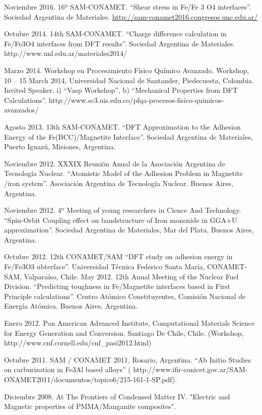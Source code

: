 Noviembre 2016. 16º SAM-CONAMET. ``Shear stress in Fe/Fe 3 O4
interfaces''. Sociedad Argentina de Materiales.
\url{http://sam-conamet2016.congresos.unc.edu.ar/}

Octubre 2014. 14th SAM-CONAMET. ``Charge difference calculation in
Fe/Fe3O4 interfaces from DFT results''. Sociedad Argentina de
Materiales. http://www.unl.edu.ar/materiales2014/

Marzo 2014. Workshop en Procesamiento Físico Químico Avanzado. Workshop,
10 -- 15 March 2014, Universidad Nacional de Santander, Piedecuesta,
Colombia. Invited Speaker. i) ``Vasp Workshop'', b) ``Mechanical
Properties from DFT Calculations''.
http://www.sc3.uis.edu.co/pfqa-procesos-fisico-quimicos-avanzados/

Agosto 2013. 13th SAM-CONAMET. ``DFT Approximation to the Adhesion
Energy of the Fe(BCC)/Magnetite Interface''. Sociedad Argentina de
Materiales, Puerto Iguazú, Misiones, Argentina.

Noviembre 2012. XXXIX Reunión Anual de la Asociación Argentina de
Tecnología Nuclear. ``Atomistic Model of the Adhesion Problem in
Magnetite /iron system''. Asociación Argentina de Tecnología Nuclear.
Buenos Aires, Argentina.

Noviembre 2012. 4º Meeting of young researchers in Cience And
Technology. ``Spin-Orbit Coupling effect on bandstructure of Iron
monoxide in GGA+U approximation''. Sociedad Argentina de Materiales, Mar
del Plata, Buenos Aires, Argentina.

Octubre 2012. 12th CONAMET/SAM ``DFT study on adhesion energy in
Fe/Fe3O3 ubterface''. Universidad Técnica Federico Santa María,
CONAMET-SAM, Valparaíso, Chile. May 2012. 12th Anual Meeting of the
Nuclear Fuel Division. ``Predicting toughness in Fe/Magnetite interfaces
based in First Principle calculations''. Centro Atómico Constituyentes,
Comisión Nacional de Energía Atómica. Buenos Aires, Argentina.

Enero 2012. Pan American Advanced Institute, Computational Materials
Science for Energy Generation and Conversion. Santiago De Chile, Chile.
(Workshop, http://www.cnf.cornell.edu/cnf\_pasi2012.html)

Octubre 2011. SAM / CONAMET 2011, Rosario, Argentina. ``Ab Initio
Studies on carburization in Fe3Al based alloys'' (
http://www.ifir-conicet.gov.ar/SAM-ONAMET2011/documentos/topico6/215-161-1-SP.pdf).

Diciembre 2008. At The Frontiers of Condensed Matter IV. "Electric and
Magnetic properties of PMMA/Manganite composites".

